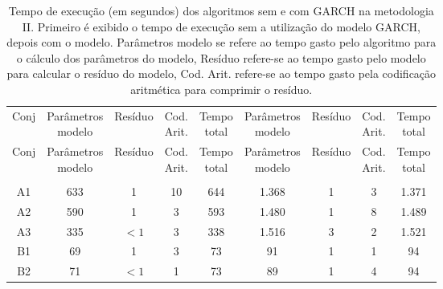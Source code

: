 \begin{center}
\begin{longtable}{ccccc|cccc}
\toprule
\rowcolor{white}
\caption[Metodologia II: tempo de execução]{Tempo de execução (em segundos)
dos algoritmos sem e com GARCH na metodologia II. Primeiro é exibido o tempo de
execução sem a utilização do modelo GARCH, depois com o modelo. Parâmetros
modelo se refere ao tempo gasto pelo algoritmo para o cálculo dos parâmetros do
modelo, Resíduo refere-se ao tempo gasto pelo modelo para calcular o resíduo do
modelo, Cod. Arit. refere-se ao tempo gasto pela codificação aritmética para
comprimir o resíduo.} \label{tab:EvolucaoEntropiaMet2}\\
\midrule
Conj & \specialcell{Parâmetros\\modelo} &
Resíduo & \specialcell{Cod.\\Arit.} & \specialcell{Tempo\\total} &
\specialcell{Parâmetros\\modelo} &
Resíduo & \specialcell{Cod.\\Arit.} & \specialcell{Tempo\\total} \\
\midrule
\endfirsthead 
\midrule
\rowcolor{white}
Conj & \specialcell{Parâmetros\\modelo} &
Resíduo & \specialcell{Cod.\\Arit.} & \specialcell{Tempo\\total} &
\specialcell{Parâmetros\\modelo} &
Resíduo & \specialcell{Cod.\\Arit.} & \specialcell{Tempo\\total} \\
\toprule
\endhead
\midrule \\ %
\endfoot
\bottomrule 
\endlastfoot
    A1    & 633   & 1     & 10    & 644   & 1.368 & 1     & 3     & 1.371 \\
    A2    & 590   & 1     & 3     & 593   & 1.480 & 1     & 8     & 1.489 \\
    A3    & 335   & $<1$     & 3     & 338   & 1.516 & 3     & 2     & 1.521 \\
    B1    & 69    & 1     & 3     & 73    & 91    & 1     & 1     & 94 \\
    B2    & 71    & $<1$     & 1     & 73    & 89    & 1     & 4     & 94 \\

\end{longtable}
\end{center}
